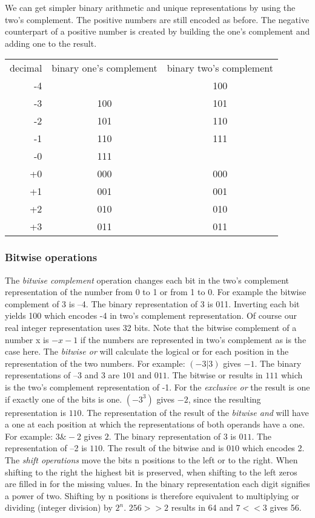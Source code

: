 We can get simpler binary arithmetic and unique representations by using the two's complement. The positive numbers are still encoded as before. The negative counterpart of a positive number is created by building the one's complement and adding one to the result. 

\begin{center}
\begin{tabular}{rcc}
decimal & binary one's complement & binary two's complement  \\
-4 &     & 100 \\
-3 & 100 & 101 \\
-2 & 101 & 110 \\
-1 & 110 & 111 \\
-0 & 111 &     \\
+0 & 000 & 000 \\
+1 & 001 & 001 \\
+2 & 010 & 010 \\
+3 & 011 & 011 \\
\end{tabular}
\label{tbl:twos_complement}
\end{center}

\subsubsection{Bitwise operations}

The \textit{bitwise complement} operation changes each bit in the two's complement representation of the number from 0 to 1 or from 1 to 0. For example the bitwise complement of 3 is --4. The binary representation of 3 is 011. Inverting each bit yields 100 which encodes -4 in two's complement representation. Of course our real integer representation uses 32 bits. Note that the bitwise complement of a number x is $-x-1$ if the numbers are represented in two's complement as is the case here. The \textit{bitwise or} will calculate the logical or for each position in the representation of the two numbers. For example: $(-3 | 3)$ gives $-1$. The binary representations of --3 and 3 are $101$ and $011$. The bitwise or results in $111$ which is the two's complement representation of -1. For the \textit{exclusive or} the result is one if exactly one of the bits is one. $(-3 ^ 3)$ gives $-2$, since the resulting representation is $110$. The representation of the result of the \textit{bitwise and} will have a one at each position at which the representations of both operands have a one. For example: $3 \& -2$ gives $2$. The binary representation of 3 is $011$. The representation of --2 is $110$. The result of the bitwise and is $010$ which encodes 2. The \textit{shift operations} move the bits n positions to the left or to the right. When shifting to the right the highest bit is preserved, when shifting to the left zeros are filled in for the missing values. In the binary representation each digit signifies a power of two. Shifting by n positions is therefore equivalent to multiplying or dividing (integer division) by $2^{n}$. $256>>2$ results in 64 and $7<<3$ gives 56.

